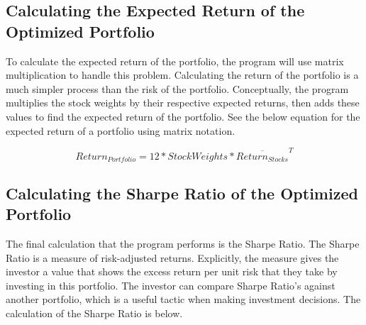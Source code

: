 \documentclass[12pt,english]{article}
\begin{document}
            \begin{doublespace}
        
        \subsection{Calculating the Expected Return of the Optimized Portfolio} 

            \indent{}\indent{}
            To calculate the expected return of the portfolio, the program will use matrix multiplication to handle this problem. Calculating the return of the portfolio is a much simpler process than the risk of the portfolio. Conceptually, the program multiplies the stock weights by their respective expected returns, then adds these values to find the expected return of the portfolio. See the below equation for the expected return of a portfolio using matrix notation.
            	
            \end{doublespace}
                \begin{singlespace}
                    \begin{center}
                        \begin{equation} \label{Portfolio Return}
                            Return_{Portfolio} = 
                            12 * StockWeights * \overline{Return_{Stocks}}^{T}
                        \end{equation}
                    \end{center}
                \end{singlespace}
            \begin{doublespace}
        
        \subsection{Calculating the Sharpe Ratio of the Optimized Portfolio}

            \indent{}\indent{}
            The final calculation that the program performs is the Sharpe Ratio. The Sharpe Ratio is a measure of risk-adjusted returns. Explicitly, the measure gives the investor a value that shows the excess return per unit risk that they take by investing in this portfolio. The investor can compare Sharpe Ratio’s against another portfolio, which is a useful tactic when making investment decisions. The calculation of the Sharpe Ratio is below.
            	
            \end{doublespace}
\end{document}
